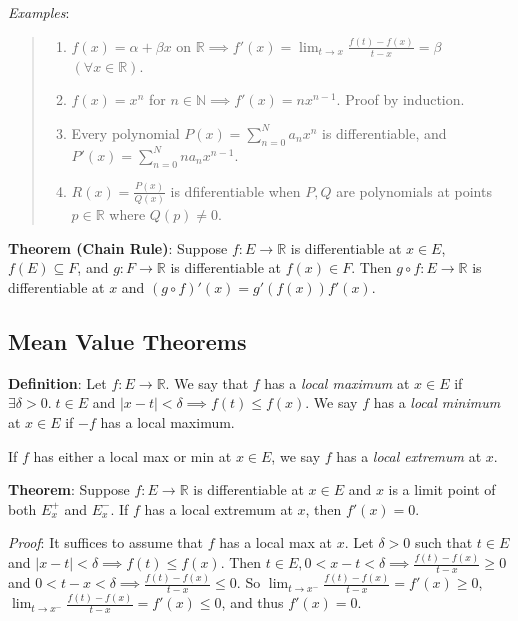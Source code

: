 \documentclass[11pt]{article}
\begin{document}
\emph{Examples}:
\begin{quote}\vspace{-0.3cm}
	\begin{enumerate}
	\item $f(x) = \alpha + \beta x$ on $\mathbb{R} \implies f'(x) = \lim_{t \to x} \frac{f(t) - f(x)}{t-x} = \beta$ $(\forall x \in \mathbb{R})$.
	\item $f(x) = x^n$ for $n \in \mathbb{N} \implies f'(x) = nx^{n-1}$. Proof by induction.
	\item Every polynomial $P(x) = \sum_{n=0}^N a_n x^n$ is differentiable, and $P'(x) = \sum_{n=0}^N na_n x^{n-1}$.
	\item $R(x) = \frac{P(x)}{Q(x)}$ is dfiferentiable when $P, Q$ are polynomials at points $p \in \mathbb{R}$ where $Q(p) \neq 0$.
	\end{enumerate}
\end{quote}

\textbf{Theorem (Chain Rule)}: Suppose $f : E \to \mathbb{R}$ is differentiable at $x \in E$, $f(E) \subseteq F$, and $g : F \to \mathbb{R}$ is differentiable at $f(x) \in F$. Then $g \circ f : E \to \mathbb{R}$ is differentiable at $x$ and $(g \circ f)'(x) = g'(f(x)) f'(x)$.

\subsection{Mean Value Theorems}

\textbf{Definition}: Let $f : E \to \mathbb{R}$. We say that $f$ has a \emph{local maximum} at $x \in E$ if $\exists \delta > 0.\; t \in E$ and $|x-t| < \delta \implies f(t) \leq f(x)$. We say $f$ has a \emph{local minimum} at $x \in E$ if $-f$ has a local maximum.

If $f$ has either a local max or min at $x \in E$, we say $f$ has a \emph{local extremum} at $x$.

\textbf{Theorem}: Suppose $f : E \to \mathbb{R}$ is differentiable at $x \in E$ and $x$ is a limit point of both $E_x^+$ and $E_x^-$. If $f$ has a local extremum at $x$, then $f'(x) = 0$.

\emph{Proof}: It suffices to assume that $f$ has a local max at $x$. Let $\delta > 0$ such that $t \in E$ and $|x-t| < \delta \implies f(t) \leq f(x)$. Then $t \in E, 0 < x-t < \delta \implies \frac{f(t) - f(x)}{t-x} \geq 0$ and $0 < t-x < \delta \implies \frac{f(t) - f(x)}{t-x} \leq 0$. So $\lim_{t \to x^-} \frac{f(t) - f(x)}{t - x} = f'(x) \geq 0$, $\lim_{t \to x^-} \frac{f(t) - f(x)}{t - x} = f'(x) \leq 0$, and thus $f'(x) = 0$.
\end{document}
